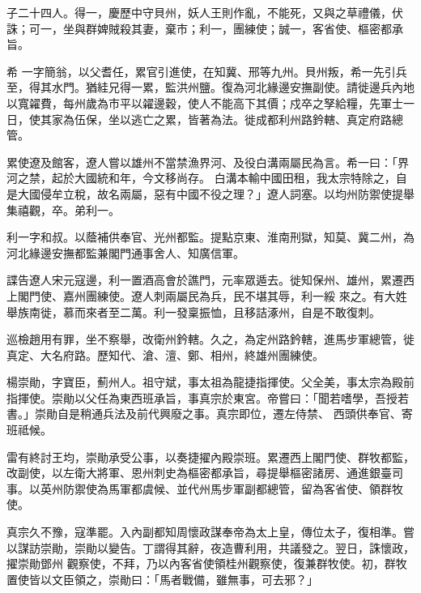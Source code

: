 \begin{pinyinscope}
 子二十四人。得一，慶歷中守貝州，妖人王則作亂，不能死，又與之草禮儀，伏誅；可一，坐與群婢賊殺其妻，棄市；利一，團練使；誠一，客省使、樞密都承旨。



 希
 一字簡翁，以父耆任，累官引進使，在知冀、邢等九州。貝州叛，希一先引兵至，得其水門。猶絓兄得一累，監洪州鹽。復為河北緣邊安撫副使。請徙邊兵內地以寬糴費，每州歲為市平以糴邊穀，使人不能高下其價；戍卒之孥給糧，先軍士一日，使其家為伍保，坐以逃亡之累，皆著為法。徙成都利州路鈐轄、真定府路總管。



 累使遼及館客，遼人嘗以雄州不當禁漁界河、及役白溝兩屬民為言。希一曰：「界河之禁，起於大國統和年，今文移尚存。
 白溝本輸中國田租，我太宗特除之，自是大國侵牟立稅，故名兩屬，惡有中國不役之理？」遼人詞塞。以均州防禦使提舉集禧觀，卒。弟利一。



 利一字和叔。以蔭補供奉官、光州都監。提點京東、淮南刑獄，知莫、冀二州，為河北緣邊安撫都監兼閣門通事舍人、知廣信軍。



 諜告遼人宋元寇邊，利一置酒高會於譙門，元率眾遁去。徙知保州、雄州，累遷西上閣門使、嘉州團練使。遼人刺兩屬民為兵，民不堪其辱，利一綏
 來之。有大姓舉族南徙，慕而來者至二萬。利一發稟振恤，且移詰涿州，自是不敢復刺。



 巡檢趙用有罪，坐不察舉，改衛州鈐轄。久之，為定州路鈐轄，進馬步軍總管，徙真定、大名府路。歷知代、滄、澶、鄭、相州，終雄州團練使。



 楊崇勛，字寶臣，薊州人。祖守斌，事太祖為龍捷指揮使。父全美，事太宗為殿前指揮使。崇勛以父任為東西班承旨，事真宗於東宮。帝嘗曰：「聞若嗜學，吾授若書。」崇勛自是稍通兵法及前代興廢之事。真宗即位，遷左侍禁、
 西頭供奉官、寄班祗候。



 雷有終討王均，崇勛承受公事，以奏捷擢內殿崇班。累遷西上閣門使、群牧都監，改副使，以左衛大將軍、恩州刺史為樞密都承旨，尋提舉樞密諸房、通進銀臺司事。以英州防禦使為馬軍都虞候、並代州馬步軍副都總管，留為客省使、領群牧使。



 真宗久不豫，寇準罷。入內副都知周懷政謀奉帝為太上皇，傳位太子，復相準。嘗以謀訪崇勛，崇勛以變告。丁謂得其辭，夜造曹利用，共議發之。翌日，誅懷政，擢崇勛鄧州
 觀察使，不拜，乃以內客省使領桂州觀察使，復兼群牧使。初，群牧置使皆以文臣領之，崇勛曰：「馬者戰備，雖無事，可去邪？」




\end{pinyinscope}
